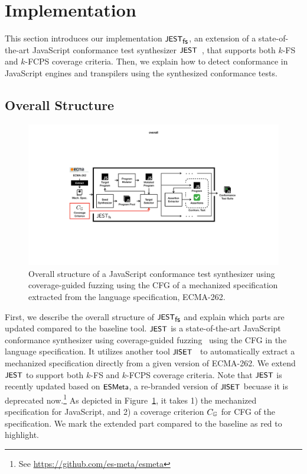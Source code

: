 \section{Implementation}\label{sec:impl}

This section introduces our implementation $\textsf{\small JEST}_{\textsf{\small fs}}$, an extension of a
state-of-the-art JavaScript conformance test synthesizer $\textsf{\small JEST}$~\cite{jest},
that supports both $k$-FS and $k$-FCPS coverage criteria.
%
Then, we explain how to detect conformance in JavaScript engines and transpilers
using the synthesized conformance tests.


\subsection{Overall Structure}\label{sec:overall}

\begin{figure}
  \includegraphics[width=\textwidth]{img/overall}
  \caption{
    Overall structure of a JavaScript conformance test synthesizer using
    coverage-guided fuzzing using the CFG of a mechanized specification
    extracted from the language specification, ECMA-262.
  }
  \label{fig:overall}
\end{figure}


First, we describe the overall structure of $\textsf{\small JEST}_{\textsf{\small fs}}$ and explain which parts are
updated compared to the baseline tool.
%
$\textsf{\small JEST}$ is a state-of-the-art JavaScript conformance synthesizer using
coverage-guided fuzzing~\cite{afl} using the CFG in the language specification.
%
It utilizes another tool $\textsf{\small JISET}$~\cite{jiset} to automatically extract a
mechanized specification directly from a given version of ECMA-262.
%
We extend $\textsf{\small JEST}$ to support both $k$-FS and $k$-FCPS coverage criteria.
%
Note that $\textsf{\small JEST}$ is recently updated based on $\textsf{\small ESMeta}$, a re-branded version
of $\textsf{\small JISET}$ becuase it is deprecated now.\footnote{
  See \url{https://github.com/es-meta/esmeta}
}
%
As depicted in Figure~\ref{fig:overall}, it takes 1) the mechanized
specification for JavaScript, and 2) a coverage criterion $C_{\mathbb{G}}$ for CFG
of the specification.
%
We mark the extended part compared to the baseline as red to highlight.


